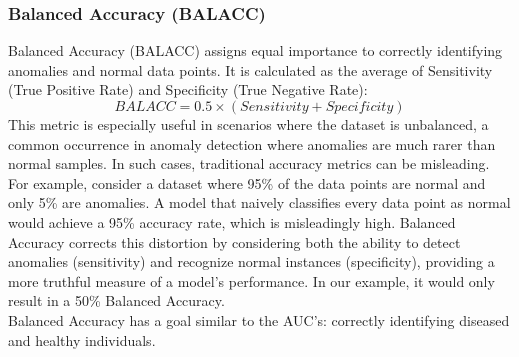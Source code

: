 \subsubsection{Balanced Accuracy (BALACC)}
Balanced Accuracy (BALACC) assigns equal importance to correctly identifying anomalies and normal data points. It is calculated as the average of Sensitivity (True Positive Rate) and Specificity (True Negative Rate):
\[ BALACC=0.5 \times (Sensitivity + Specificity) \]
This metric is especially useful in scenarios where the dataset is unbalanced, a common occurrence in anomaly detection where anomalies are much rarer than normal samples. In such cases, traditional accuracy metrics can be misleading. For example, consider a dataset where 95\% of the data points are normal and only 5\% are anomalies. A model that naively classifies every data point as normal would achieve a 95\% accuracy rate, which is misleadingly high. Balanced Accuracy corrects this distortion by considering both the ability to detect anomalies (sensitivity) and recognize normal instances (specificity), providing a more truthful measure of a model's performance. In our example, it would only result in a 50\% Balanced Accuracy.\\
Balanced Accuracy has a goal similar to the AUC's: correctly identifying diseased and healthy individuals.



